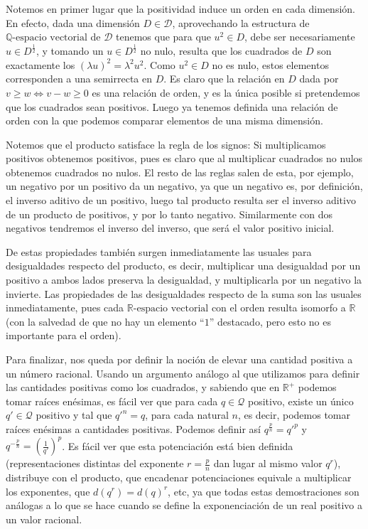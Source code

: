 \documentclass{article}
\def\rev{$\mathbb{R} \mbox{-espacio vectorial } $}
\def\qev{$\mathbb{Q} \mbox{-espacio vectorial } $}
\def\Dimensions{\mathcal D}
\def\Quantities{\mathcal Q}
\begin{document}
Notemos en primer lugar que la positividad induce un orden en cada dimensión. En efecto, dada una dimensión $D \in \Dimensions$,
aprovechando la estructura de \qev de $\Dimensions$ tenemos que para que $u^2 \in D$, debe ser necesariamente $u \in D^{\frac{1}{2}}$,
y tomando un $u \in D^{\frac{1}{2}}$ no nulo, resulta que los cuadrados de $D$ son exactamente los
$(\lambda u)^2 = \lambda^2 u^2$. Como $u^2 \in D$ no es nulo, estos elementos corresponden a una semirrecta en $D$.
Es claro que la relación en $D$ dada por $v \geq w \Leftrightarrow  v - w \geq 0$ es una relación de orden, y es la única
posible si pretendemos que los cuadrados sean positivos. Luego ya tenemos definida una relación de orden con la que podemos
comparar elementos de una misma dimensión.

Notemos que el producto satisface la regla de los signos: Si multiplicamos positivos obtenemos positivos, pues es claro que
al multiplicar cuadrados no nulos obtenemos cuadrados no nulos. El resto de las reglas salen de esta, por ejemplo,
un negativo por un positivo da un negativo, ya que un negativo es, por definición, el inverso aditivo de un positivo,
luego tal producto resulta ser el inverso aditivo de un producto de positivos, y por lo tanto negativo. Similarmente
con dos negativos tendremos el inverso del inverso, que será el valor positivo inicial.

De estas propiedades también surgen inmediatamente las usuales para desigualdades respecto del producto, es decir,
multiplicar una desigualdad por un positivo a ambos lados preserva la desigualdad, y multiplicarla por un negativo
la invierte. Las propiedades de las desigualdades respecto de la suma son las usuales inmediatamente, pues cada
\rev con el orden resulta isomorfo a $\mathbb{R}$ (con la salvedad de que no hay un elemento ``$1$'' destacado, pero
esto no es importante para el orden).

Para finalizar, nos queda por definir la noción de elevar una cantidad positiva a un número racional. Usando un argumento
análogo al que utilizamos para definir las cantidades positivas como los cuadrados, y sabiendo que en $\mathbb{R^+}$ podemos tomar
raíces enésimas, es fácil ver que para cada $q \in \Quantities$
positivo, existe un único $q' \in \Quantities$ positivo y tal que $q'^n = q$, para cada natural $n$, es decir, podemos tomar
raíces enésimas a cantidades positivas. Podemos definir así $q^{\frac{p}{n}} = q'^p$ y $q^{-\frac{p}{n}} = \left (\frac{1}{q'} \right)^p$. Es fácil ver que esta potenciación
está bien definida (representaciones distintas del exponente $r = \frac{p}{n}$ dan lugar al mismo valor $q^r$),
distribuye con el producto, que encadenar potenciaciones equivale a multiplicar los exponentes, que
$d(q^r) = d(q)^r$, etc, ya que todas estas demostraciones son análogas a lo que se hace cuando se define la exponenciación
de un real positivo a un valor racional.
\end{document}
